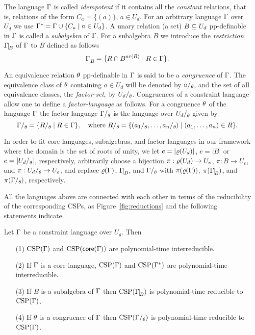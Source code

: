 \documentclass[11pt,letter]{article}
\begin{document}
The language $\Gamma$ is called \emph{idempotent} if it contains all the \emph{constant} relations, that is, relations of the form $C_a=\{(a)\}$, $a\in U_d$. For an arbitrary language $\Gamma$ over $U_d$ we use $\Gamma^*=\Gamma\cup\{C_a\mid a\in U_d\}$.  A unary relation (a set) $B\subseteq U_d$ pp-definable in $\Gamma$ is called a \emph{subalgebra} of $\Gamma$. For a subalgebra $B$ we introduce the \emph{restriction} $\Gm\red B$ of $\Gamma$ to $B$ defined as follows
 \[
\Gm\red B=\{\rel\cap B^{ar(\rel)}\mid \rel\in\Gm\}.
\]


An equivalence relation $\theta$ pp-definable in $\Gamma$ is said to be a \emph{congruence} of $\Gamma$. The equivalence class of $\theta$ containing $a\in U_d$ will be denoted by $a\fac\th$, and the set of all equivalence classes, the \emph{factor-set}, by $U_d\fac\th$. Congruences of a constraint language allow one to define a \emph{factor-language} as follows. For a congruence $\theta$ of the language $\Gamma$ the factor language $\Gm\fac\th$ is the language over $U_d\fac\th$ given by 
\[
\Gm\fac\th=\{\rel\fac\th\mid \rel\in\Gm\}, \quad\text{where } \rel\fac\th=\{(a_1\fac\th\zd a_n\fac\th)\mid  (\vc an)\in\rel\}.
\]

In order to fit core languages, subalgebras, and factor-languages in our framework where the domain is the set of roots of unity, we let $e=|\varrho(U_d)|$, $e=|B|$ or $e=|U_d\fac\th|$, respectively, arbitrarily choose a bijection $\pi:\varrho(U_d)\to U_e$, $\pi:B\to U_e$, and $\pi:U_d\fac\th\to U_e$, and replace $\varrho(\Gamma)$, $\Gm\red B$, and $\Gm\fac\th$ with $\pi(\varrho(\Gamma))$, $\pi(\Gm\red B)$, and $\pi(\Gm\fac\th)$, respectively. 

All the languages above are connected with each other in terms of the reducibility of the corresponding CSPs, as Figure~\ref{fig:reductions} and the following statements indicate.

\begin{prop}\label{pro:reductions}
Let $\Gamma$ be a constraint language over $U_d$. Then
\begin{itemize}
\item[(1)]
  ${\rm CSP}(\Gamma)$ and ${\rm CSP}(\mathsf{core}(\Gamma))$ are polynomial-time interreducible.
\item[(2)]
If $\Gamma$ is a core language, ${\rm CSP}(\Gamma)$ and ${\rm CSP}(\Gamma^*)$ are polynomial-time interreducible.
\item[(3)]
If $B$ is a subalgebra of $\Gamma$ then $\CSP(\Gm\red B)$ is polynomial-time reducible to ${\rm CSP}(\Gamma)$.
\item[(4)]
If $\theta$ is a congruence of $\Gamma$ then $\CSP(\Gm\fac\th)$ is polynomial-time reducible to ${\rm CSP}(\Gamma)$.
\end{itemize}
\end{prop}
\end{document}
